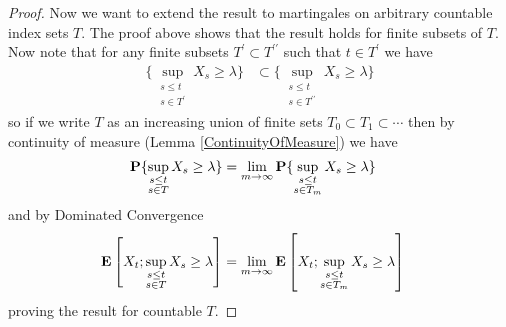 \begin{proof}
Now we want to extend the result to martingales on arbitrary countable
index sets $T$.  The proof above shows that the result holds for
finite subsets of $T$.  Now note that for any finite subsets $T^\prime
\subset T^{\prime\prime}$ such that $t \in T^\prime$ we have 
\begin{align*}
\lbrace \sup_{\substack{s \leq t\\
s \in T^\prime}} X_s \geq \lambda  \rbrace &\subset
\lbrace \sup_{\substack{s \leq t\\
s \in T^{\prime\prime}}} X_s \geq \lambda  \rbrace
\end{align*}
so if we write $T$ as an increasing union of finite sets $T_0 \subset
T_1 \subset \cdots$ then by continuity of measure (Lemma
\ref{ContinuityOfMeasure}) we have 
\begin{align*}
\textbf{P}\{\sup_{\substack{s \leq t \\ s \in T}} X_s \geq \lambda\}
&= 
\lim_{m \to \infty} \textbf{P}\{\sup_{\substack{s \leq t \\
s \in T_m}}  X_s \geq \lambda\} 
\end{align*}
and by Dominated Convergence 
\begin{align*}
\textbf{E}\left[X_t ; \sup_{\substack{s \leq t \\ s \in T}} X_s  \geq \lambda\right] &= 
\lim_{m \to \infty} \textbf{E}\left[X_t ; \sup_{\substack{s \leq t \\ s
      \in T_m}} X_s  \geq \lambda\right]
\end{align*}
proving the result for countable $T$.
\end{proof}

